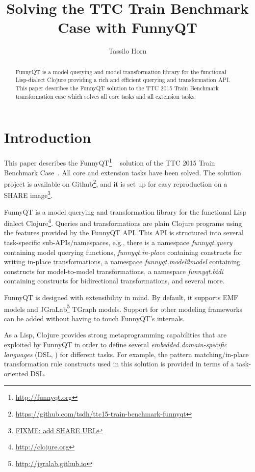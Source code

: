 \documentclass[submission]{eptcs}
\title{Solving the TTC Train Benchmark Case with FunnyQT}
\author{Tassilo Horn
  \institute{Institute for Software Technology, University Koblenz-Landau, Germany}
  \email{horn@uni-koblenz.de}}
\begin{document}
\maketitle

\begin{abstract}
  FunnyQT is a model querying and model transformation library for the
  functional Lisp-dialect Clojure providing a rich and efficient querying and
  transformation API.  This paper describes the FunnyQT solution to the TTC
  2015 Train Benchmark transformation case which solves all core tasks and all
  extension tasks.
\end{abstract}


\section{Introduction}
\label{sec:introduction}

This paper describes the FunnyQT\footnote{\url{http://funnyqt.org}}
~\cite{Horn2013MQWFQ} solution of the TTC 2015 Train Benchmark
Case~\cite{train-benchmark-case-desc}.  All core and extension tasks have been
solved.  The solution project is available on
Github\footnote{\url{https://github.com/tsdh/ttc15-train-benchmark-funnyqt}},
and it is set up for easy reproduction on a SHARE image\footnote{\url{FIXME:
    add SHARE URL}}.

FunnyQT is a model querying and transformation library for the functional Lisp
dialect Clojure\footnote{\url{http://clojure.org}}.  Queries and
transformations are plain Clojure programs using the features provided by the
FunnyQT API.  This API is structured into several task-specific
sub-APIs/namespaces, e.g., there is a namespace \emph{funnyqt.query} containing
model querying functions, \emph{funnyqt.in-place} containing constructs for
writing in-place transformations, a namespace \emph{funnyqt.model2model}
containing constructs for model-to-model transformations, a namespace
\emph{funnyqt.bidi} containing constructs for bidirectional transformations,
and several more.

FunnyQT is designed with extensibility in mind.  By default, it supports EMF
\cite{Steinberg2008EEM} models and
JGraLab\footnote{\url{http://jgralab.github.io}} TGraph models.  Support for
other modeling frameworks can be added without having to touch FunnyQT's
internals.

As a Lisp, Clojure provides strong metaprogramming capabilities that are
exploited by FunnyQT in order to define several \emph{embedded domain-specific
  languages} (DSL, \cite{book:Fowler2010DSL}) for different tasks.  For
example, the pattern matching/in-place transformation rule constructs used in
this solution is provided in terms of a task-oriented DSL.
\end{document}
